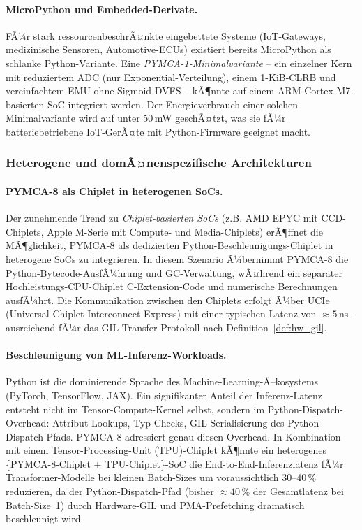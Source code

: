 ﻿\documentclass[a4paper,12pt]{scrreprt}
\theoremstyle{definition}
\begin{document}
	\paragraph{MicroPython und Embedded-Derivate.}
	FÃ¼r stark ressourcenbeschrÃ¤nkte eingebettete Systeme (IoT-Gateways,
	medizinische Sensoren, Automotive-ECUs) existiert bereits MicroPython als
	schlanke Python-Variante. Eine \emph{PYMCA-1-Minimalvariante} -- ein einzelner
	Kern mit reduziertem ADC (nur Exponential-Verteilung), einem 1-KiB-CLRB und
	vereinfachtem EMU ohne Sigmoid-DVFS -- kÃ¶nnte auf einem ARM Cortex-M7-basierten
	SoC integriert werden. Der Energieverbrauch einer solchen Minimalvariante
	wird auf unter 50\,mW geschÃ¤tzt, was sie fÃ¼r batteriebetriebene IoT-GerÃ¤te
	mit Python-Firmware geeignet macht.

	\subsubsection{Heterogene und domÃ¤nenspezifische Architekturen}

	\paragraph{PYMCA-8 als Chiplet in heterogenen SoCs.}
	Der zunehmende Trend zu \emph{Chiplet-basierten SoCs} (z.B. AMD EPYC mit
	CCD-Chiplets, Apple M-Serie mit Compute- und Media-Chiplets) erÃ¶ffnet die
	MÃ¶glichkeit, PYMCA-8 als dedizierten Python-Beschleunigungs-Chiplet in
	heterogene SoCs zu integrieren. In diesem Szenario Ã¼bernimmt PYMCA-8 die
	Python-Bytecode-AusfÃ¼hrung und GC-Verwaltung, wÃ¤hrend ein separater
	Hochleistungs-CPU-Chiplet C-Extension-Code und numerische Berechnungen
	ausfÃ¼hrt. Die Kommunikation zwischen den Chiplets erfolgt Ã¼ber UCIe
	(Universal Chiplet Interconnect Express) mit einer typischen Latenz von
	$\approx 5$\,ns -- ausreichend fÃ¼r das GIL-Transfer-Protokoll nach
	Definition~\ref{def:hw_gil}.

	\paragraph{Beschleunigung von ML-Inferenz-Workloads.}
	Python ist die dominierende Sprache des Machine-Learning-Ã–kosystems
	(PyTorch, TensorFlow, JAX). Ein signifikanter Anteil der Inferenz-Latenz
	entsteht nicht im Tensor-Compute-Kernel selbst, sondern im Python-Dispatch-Overhead:
	Attribut-Lookups, Typ-Checks, GIL-Serialisierung des Python-Dispatch-Pfads.
	PYMCA-8 adressiert genau diesen Overhead. In Kombination mit einem
	Tensor-Processing-Unit (TPU)-Chiplet kÃ¶nnte ein heterogenes
	\{PYMCA-8-Chiplet + TPU-Chiplet\}-SoC die End-to-End-Inferenzlatenz
	fÃ¼r Transformer-Modelle bei kleinen Batch-Sizes um voraussichtlich 30--40\,\%
	reduzieren, da der Python-Dispatch-Pfad (bisher $\approx 40$\,\% der Gesamtlatenz
	bei Batch-Size~1) durch Hardware-GIL und PMA-Prefetching dramatisch beschleunigt wird.
\end{document}
